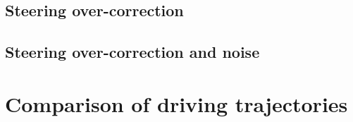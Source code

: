 


\subsection{Steering over-correction}








\subsection{Steering over-correction and noise}





\section{Comparison of driving trajectories}




